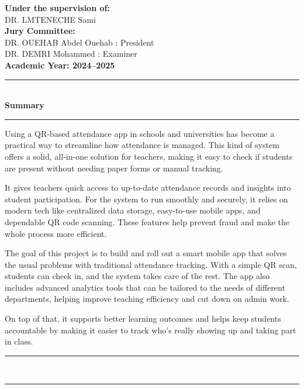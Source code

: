 \documentclass[12pt,a4paper]{report}
\begin{document}
\begin{center}
    \vspace{1cm}
    \textbf{Under the supervision of:} \\[0.2cm]
    DR. LMTENECHE Sami \\


    
    \vspace{1cm}
    \textbf{Jury Committee:} \\[0.2cm]
    DR.  OUEHAB Abdel Ouehab : President \\
    DR. DEMRI Mohammed : Examiner \\

    \vfill
    \textbf{Academic Year: 2024–2025}

\end{center}

\newpage
\newenvironment{Summary}{
    \newpage
    \phantomsection
    \addcontentsline{toc}{chapter}{Summary}
    \begin{center}
        {\color{mintgreen} \rule{\textwidth}{2pt} }\\[0.3cm]
        {\Large \textbf{Summary}}\\[0.3cm]
        {\color{mintgreen} \rule{0.8\textwidth}{1.5pt} }
    \end{center}
    \vspace{0.5cm}
    \noindent
}{
    \vspace{0.5cm}
    \begin{center}
        {\color{mintgreen} \rule{0.8\textwidth}{1.5pt} }\\[0.3cm]
        {\color{mintgreen} \rule{\textwidth}{2pt} }
    \end{center}
}


\begin{Summary}
Using a QR-based attendance app in schools and universities has become a practical way to streamline how attendance is managed. This kind of system offers a solid, all-in-one solution for teachers, making it easy to check if students are present without needing paper forms or manual tracking.

It gives teachers quick access to up-to-date attendance records and insights into student participation. For the system to run smoothly and securely, it relies on modern tech like centralized data storage, easy-to-use mobile apps, and dependable QR code scanning. These features help prevent fraud and make the whole process more efficient.

The goal of this project is to build and roll out a smart mobile app that solves the usual problems with traditional attendance tracking. With a simple QR scan, students can check in, and the system takes care of the rest. The app also includes advanced analytics tools that can be tailored to the needs of different departments, helping improve teaching efficiency and cut down on admin work.

On top of that, it supports better learning outcomes and helps keep students accountable by making it easier to track who’s really showing up and taking part in class.
\end{Summary}
\end{document}
